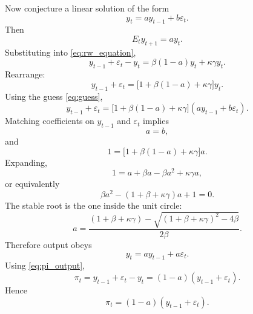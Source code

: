 \documentclass[11pt]{article}
\begin{document}
Now conjecture a linear solution of the form
\begin{equation}
y_t = a y_{t-1} + b\varepsilon_t.
\label{eq:guess}
\end{equation}
Then
\begin{equation}
E_t y_{t+1} = a y_t.
\end{equation}
Substituting into \eqref{eq:rw_equation},
\begin{equation}
y_{t-1} + \varepsilon_t - y_t
=
\beta(1-a)y_t + \kappa\gamma y_t.
\end{equation}
Rearrange:
\begin{equation}
y_{t-1} + \varepsilon_t
=
\bigl[1 + \beta(1-a) + \kappa\gamma\bigr]y_t.
\end{equation}
Using the guess \eqref{eq:guess},
\begin{equation}
y_{t-1} + \varepsilon_t
=
\bigl[1 + \beta(1-a) + \kappa\gamma\bigr](a y_{t-1} + b\varepsilon_t).
\end{equation}
Matching coefficients on $y_{t-1}$ and $\varepsilon_t$ implies
\begin{equation}
a=b,
\end{equation}
and
\begin{equation}
1 = \bigl[1 + \beta(1-a) + \kappa\gamma\bigr]a.
\end{equation}
Expanding,
\begin{equation}
1 = a + \beta a - \beta a^2 + \kappa\gamma a,
\end{equation}
or equivalently
\begin{equation}
\boxed{\beta a^2 - (1+\beta+\kappa\gamma)a + 1 = 0.}
\label{eq:a_quadratic}
\end{equation}
The stable root is the one inside the unit circle:
\begin{equation}
\boxed{
a
=
\frac{(1+\beta+\kappa\gamma)
-
\sqrt{(1+\beta+\kappa\gamma)^2 - 4\beta}}
{2\beta}.
}
\label{eq:a_root}
\end{equation}
Therefore output obeys
\begin{equation}
\boxed{y_t = a y_{t-1} + a\varepsilon_t.}
\label{eq:y_solution}
\end{equation}
Using \eqref{eq:pi_output},
\begin{equation}
\pi_t = y_{t-1} + \varepsilon_t - y_t
= (1-a)(y_{t-1} + \varepsilon_t).
\end{equation}
Hence
\begin{equation}
\boxed{\pi_t = (1-a)(y_{t-1} + \varepsilon_t).}
\label{eq:pi_solution}
\end{equation}
\end{document}
